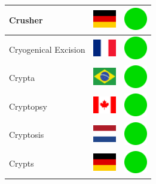 \documentclass[12pt, a4paper, twoside]{report}
\begin{document}
\begin{center}
\begin{longtable}{|p{5cm}|p{2cm}|p{2cm}|}
 Crusher                                                    & \includegraphics[width=1cm]{../img/flags/de} &   \includegraphics[width=1cm]{../likes/y} \\ \hline
 Cryogenical Excision                                       & \includegraphics[width=1cm]{../img/flags/fr} &   \includegraphics[width=1cm]{../likes/y} \\ \hline
 Crypta                                                     & \includegraphics[width=1cm]{../img/flags/br} &   \includegraphics[width=1cm]{../likes/y} \\ \hline
 Cryptopsy                                                  & \includegraphics[width=1cm]{../img/flags/ca} &   \includegraphics[width=1cm]{../likes/y} \\ \hline
 Cryptosis                                                  & \includegraphics[width=1cm]{../img/flags/nl} &   \includegraphics[width=1cm]{../likes/y} \\ \hline
 Crypts                                                     & \includegraphics[width=1cm]{../img/flags/de} &   \includegraphics[width=1cm]{../likes/y} \\ \hline

\end{longtable}
\end{center}
\end{document}
